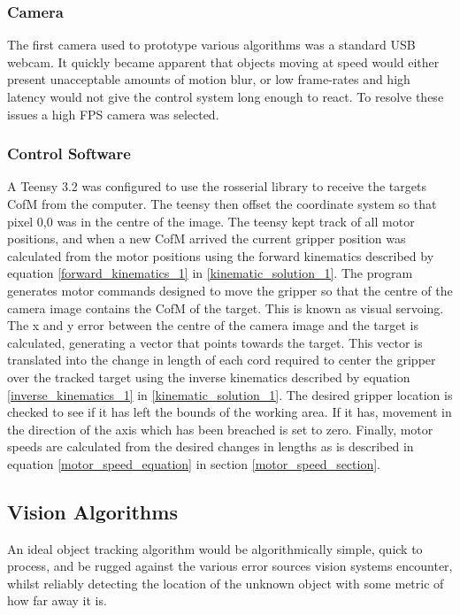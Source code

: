 \documentclass[conference]{IEEEtran}
\begin{document}
\subsubsection{Camera}
The first camera used to prototype various algorithms was a standard USB webcam. It quickly became apparent that objects moving at speed would either present unacceptable amounts of motion blur, or low frame-rates and high latency would not give the control system long enough to react. To resolve these issues  a high FPS camera was selected. 

\subsubsection{Control Software}
A Teensy 3.2 was configured to use the rosserial library to receive the targets CofM from the computer. The teensy then offset the coordinate system so that pixel 0,0 was in the centre of the image. The teensy kept track of all motor positions, and when a new CofM arrived the current gripper position was calculated from the motor positions using the forward kinematics described by equation \ref{forward_kinematics_1} in \ref{kinematic_solution_1}. The program generates motor commands designed to move the gripper so that the centre of the camera image contains the CofM of the target. This is known as visual servoing. The x and y error between the centre of the camera image and the target is calculated, generating a vector that points towards the target. This vector is translated into the change in length of each cord required to center the gripper over the tracked target using the inverse kinematics described by equation \ref{inverse_kinematics_1} in \ref{kinematic_solution_1}. The desired gripper location is checked to see if it has left the bounds of the working area. If it has, movement in the direction of the axis which has been breached is set to zero. Finally, motor speeds are calculated from the desired changes in lengths as is described in equation \ref{motor_speed_equation} in section \ref{motor_speed_section}.

\subsection{Vision Algorithms}
An ideal object tracking algorithm would be algorithmically simple, quick to process, and be rugged against the various error sources vision systems encounter, whilst reliably detecting the location of the unknown object with some metric of how far away it is.
\end{document}

